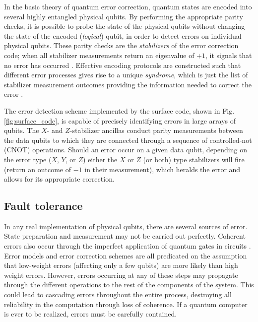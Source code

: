 In the basic theory of quantum error correction, quantum states are encoded into
several highly entangled physical qubits. By performing the appropriate parity
checks, it is possible to probe the state of the physical qubits without
changing the state of the encoded (\textit{logical}) qubit, in order to detect
errors on individual physical qubits. These parity checks are the
\textit{stabilizers} of the error correction code; when all stabilizer
measurements return an eigenvalue of $+1$, it signals that no error has occurred
\cite{nielsen_chuang_2010}. Effective encoding protocols are constructed such
that different error processes gives rise to a unique \textit{syndrome}, which
is just the list of stabilizer measurement outcomes providing the information
needed to correct the error \cite{fowler12_surfac_codes}.

The error detection scheme implemented by the surface code, shown in Fig.
\ref{fig:surface_code}, is capable of precisely identifying errors in large
arrays of qubits. The $X$- and $Z$-stabilizer ancillas conduct parity
measurements between the data qubits to which they are connected through a
sequence of controlled-not (CNOT) operations. Should an error occur on a given
data qubit, depending on the error type ($X$, $Y$, or $Z$) either the $X$ or $Z$
(or both) type stabilizers will fire (return an outcome of $-1$ in their
measurement), which heralds the error and allows for its appropriate correction.

\subsection{Fault tolerance}
In any real implementation of physical qubits, there are several sources of
error. State preparation and measurement may not be carried out perfectly.
Coherent errors also occur through the imperfect application of quantum gates in
circuits \cite{Devitt_2013}. Error models and error correction schemes are all
predicated on the assumption that low-weight errors (affecting only a few
qubits) are more likely than high weight errors. However, errors occurring at
any of these steps may propagate through the different operations to the rest of
the components of the system. This could lead to cascading errors throughout the
entire process, destroying all reliability in the computation through loss of
coherence. If a quantum computer is ever to be realized, errors must be
carefully contained.

